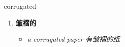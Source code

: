 
\begin{frame}
{\huge corrugated}
\begin{center}
\begin{enumerate}\Large
  \item \textbf{皱褶的}
  \begin{itemize}
    \item \em{\Large{a corrugated paper 有皱褶的纸}}
  \end{itemize}
\end{enumerate}
\end{center}
\end{frame}
